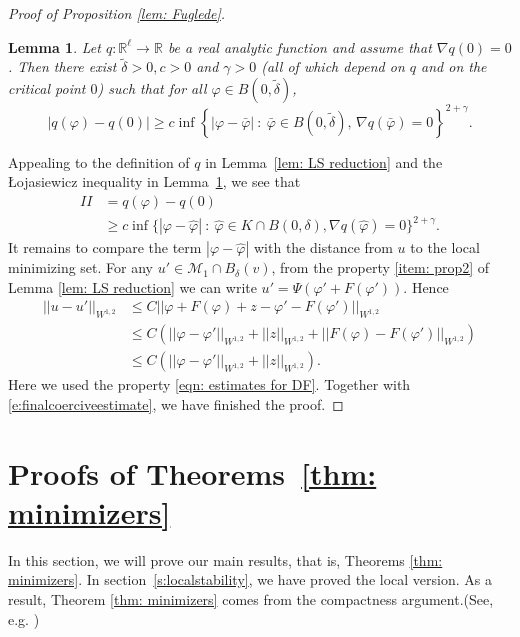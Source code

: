\documentclass[12pt]{amsart}
\newtheorem{lemma}[theorem]{Lemma}
\newcommand{\g}{{\gamma}}
\newcommand{\M}{{\mathcal{M}}}
\newcommand{\vphi}{\varphi}
\newcommand{\na}{{\nabla}}
\begin{document}
\begin{proof}[Proof of Proposition \ref{lem: Fuglede}]
\begin{lemma}\label{lo}
Let $q: \mathbb R^\ell \rightarrow \mathbb R$ be a real analytic function and assume that $\nabla q(0) = 0$. Then there exist  $\tilde{\delta} > 0, c > 0$ and $\g > 0$ (all of which depend on $q$ and on the critical point $0$)
such that for all $\vphi \in B(0,\tilde{\delta})$,
 \begin{equation}\label{e: lojdistance}
|q(\vphi) - q(0)| \geq c \inf\left\{ |\vphi - \bar \vphi | \ : \ \bar \vphi \in B(0,\tilde{\delta}), \, \na q(\bar \vphi ) =0\right\}^{2+\g}.
\end{equation}
\end{lemma}

 Appealing to the definition of $q$ in Lemma~\ref{lem: LS reduction} and   the \L ojasiewicz inequality in  Lemma~\ref{lo}, we see that 
\begin{equation}\label{eqn: intermediate Loj} 
\begin{split}
	II& =
	q(\vphi) - q(0) \\
	& \geq c \inf\{ |\vphi - \hat{ \vphi} | \ : \  \hat{\vphi} \in K\cap B(0,\delta), \na q(\hat\vphi ) =0\}^{2+\g}.
\end{split}	
\end{equation}
It remains to compare the term $|\vphi - \hat{ \vphi} |$ with the distance from $u$ to the local minimizing set. For any $u'\in \M_1 \cap B_\delta(v)$, from the property \eqref{item: prop2} of Lemma \ref{lem: LS reduction} we can write $u'= \Psi(\vphi'+F(\vphi'))$. Hence
\begin{align*}
    ||u-u'||_{W^{1,2}} &\leq C ||\vphi + F(\vphi) + z  - \vphi'-F(\vphi')||_{W^{1,2}}\\
    &\leq C(||\vphi - \vphi'||_{W^{1,2}} +||z||_{W^{1,2}} +||F(\vphi)- F(\vphi')||_{W^{1,2}})\\
    &\leq C(||\vphi - \vphi'||_{W^{1,2}} +||z||_{W^{1,2}}).
\end{align*}
Here we used the property \eqref{eqn: estimates for DF}.
Together with \eqref{e:finalcoerciveestimate}, we have finished the proof.

\end{proof}

\section{Proofs of Theorems~\ref{thm: minimizers}}

In this section, we will prove our main results, that is, Theorems \ref{thm: minimizers}. In section~\ref{s:localstability}, we have proved the local version. As a result, Theorem \ref{thm: minimizers} comes from the compactness argument.(See, e.g. \cite{Ar04} \cite{HL99})
\end{document}
